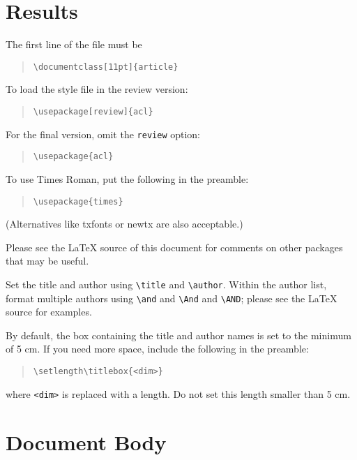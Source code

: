 \documentclass[11pt]{article}
\begin{document}
\section{Results}

The first line of the file must be
\begin{quote}
\begin{verbatim}
\documentclass[11pt]{article}
\end{verbatim}
\end{quote}

To load the style file in the review version:
\begin{quote}
\begin{verbatim}
\usepackage[review]{acl}
\end{verbatim}
\end{quote}
For the final version, omit the \verb|review| option:
\begin{quote}
\begin{verbatim}
\usepackage{acl}
\end{verbatim}
\end{quote}

To use Times Roman, put the following in the preamble:
\begin{quote}
\begin{verbatim}
\usepackage{times}
\end{verbatim}
\end{quote}
(Alternatives like txfonts or newtx are also acceptable.)

Please see the \LaTeX{} source of this document for comments on other packages that may be useful.

Set the title and author using \verb|\title| and \verb|\author|. Within the author list, format multiple authors using \verb|\and| and \verb|\And| and \verb|\AND|; please see the \LaTeX{} source for examples.

By default, the box containing the title and author names is set to the minimum of 5 cm. If you need more space, include the following in the preamble:
\begin{quote}
\begin{verbatim}
\setlength\titlebox{<dim>}
\end{verbatim}
\end{quote}
where \verb|<dim>| is replaced with a length. Do not set this length smaller than 5 cm.

\section{Document Body}
\end{document}
